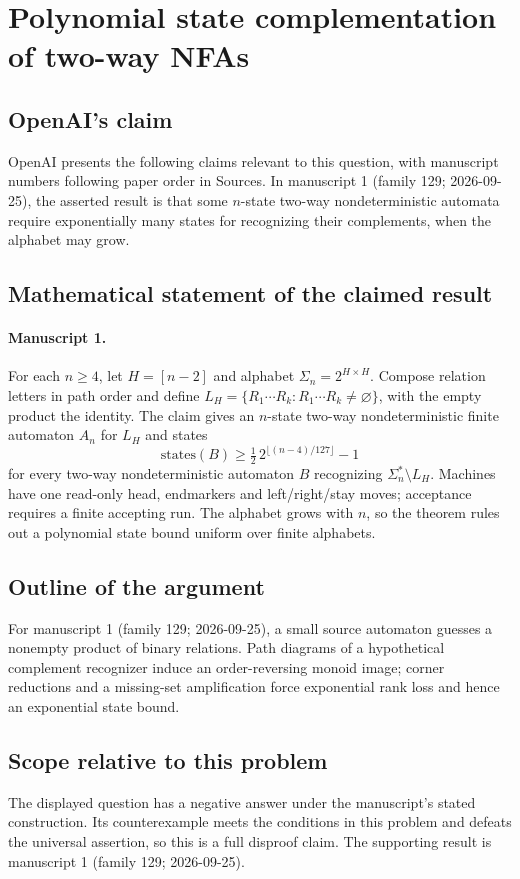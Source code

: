 \documentclass[11pt]{article}
\begin{document}
\section*{Polynomial state complementation of two-way NFAs}

\subsection{OpenAI's claim}
OpenAI presents the following claims relevant to this question, with manuscript numbers following paper order in Sources. In manuscript 1 (family 129; 2026-09-25), the asserted result is that some $n$-state two-way nondeterministic automata require exponentially many states for recognizing their complements, when the alphabet may grow.

\subsection{Mathematical statement of the claimed result}
\paragraph{Manuscript 1.}
For each $n\ge4$, let $H=[n-2]$ and alphabet $\Sigma_n=2^{H\times H}$. Compose relation letters in path order and define $L_H=\{R_1\cdots R_k:R_1\cdots R_k\ne\varnothing\}$, with the empty product the identity. The claim gives an $n$-state two-way nondeterministic finite automaton $A_n$ for $L_H$ and states
\[
 \text{states}(B)\ge\tfrac12\,2^{\lfloor(n-4)/127\rfloor}-1
\]
for every two-way nondeterministic automaton $B$ recognizing $\Sigma_n^*\setminus L_H$. Machines have one read-only head, endmarkers and left/right/stay moves; acceptance requires a finite accepting run. The alphabet grows with $n$, so the theorem rules out a polynomial state bound uniform over finite alphabets.

\subsection{Outline of the argument}
For manuscript 1 (family 129; 2026-09-25), a small source automaton guesses a nonempty product of binary relations. Path diagrams of a hypothetical complement recognizer induce an order-reversing monoid image; corner reductions and a missing-set amplification force exponential rank loss and hence an exponential state bound.

\subsection{Scope relative to this problem}
The displayed question has a negative answer under the manuscript's stated construction. Its counterexample meets the conditions in this problem and defeats the universal assertion, so this is a full disproof claim. The supporting result is manuscript 1 (family 129; 2026-09-25).
\end{document}
